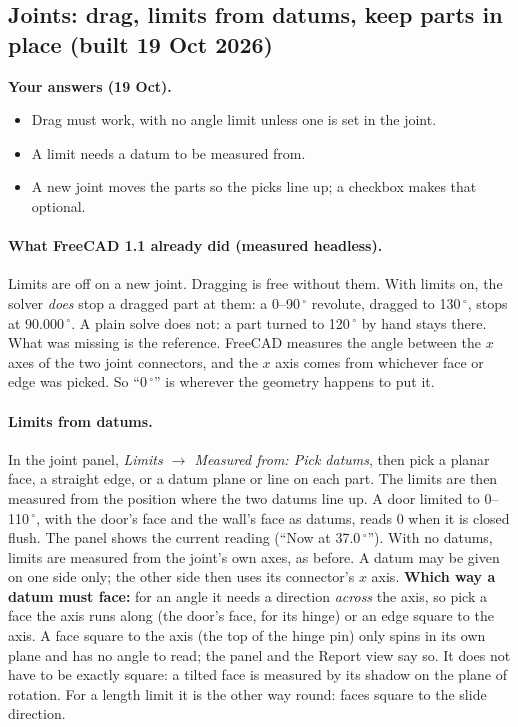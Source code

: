 \subsection{Joints: drag, limits from datums, keep parts in place (built 19 Oct 2026)}\label{sec:joints}

\textbf{Your answers (19 Oct).}
\begin{itemize}[nosep]
  \item Drag must work, with no angle limit unless one is set in the joint.
  \item A limit needs a datum to be measured from.
  \item A new joint moves the parts so the picks line up; a checkbox makes that optional.
\end{itemize}

\paragraph{What FreeCAD 1.1 already did (measured headless).} Limits are off on a new joint. Dragging is free
without them. With limits on, the solver \emph{does} stop a dragged part at them: a 0--90\,$^\circ$ revolute,
dragged to 130\,$^\circ$, stops at 90.000\,$^\circ$. A plain solve does not: a part turned to 120\,$^\circ$ by hand
stays there. What was missing is the reference. FreeCAD measures the angle between the $x$ axes of the two joint
connectors, and the $x$ axis comes from whichever face or edge was picked. So ``0\,$^\circ$'' is wherever the
geometry happens to put it.

\paragraph{Limits from datums.} In the joint panel, \emph{Limits $\rightarrow$ Measured from: Pick datums}, then
pick a planar face, a straight edge, or a datum plane or line on each part. The limits are then measured from the
position where the two datums line up. A door limited to 0--110\,$^\circ$, with the door's face and the wall's face
as datums, reads 0 when it is closed flush. The panel shows the current reading (``Now at 37.0\,$^\circ$''). With no
datums, limits are measured from the joint's own axes, as before. A datum may be given on one side only; the other
side then uses its connector's $x$ axis. \textbf{Which way a datum must face:} for an angle it needs a direction
\emph{across} the axis, so pick a face the axis runs along (the door's face, for its hinge) or an edge square to the
axis. A face square to the axis (the top of the hinge pin) only spins in its own plane and has no angle to read; the
panel and the Report view say so. It does not have to be exactly square: a tilted face is measured by its shadow on
the plane of rotation. For a length limit it is the other way round: faces square to the slide direction.

